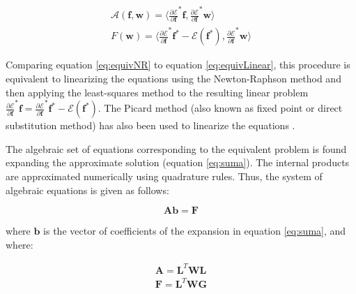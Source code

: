 \documentclass{CFD2011}
\begin{document}
\begin{eqnarray}
\mathcal{A}(\mathbf{f},\mathbf{w})= \big\langle \frac{\partial \mathcal{E}}{\partial \mathbf{f}}^*\mathbf{f} ,  \frac{\partial \mathcal{E}}{\partial \mathbf{f}}^*\mathbf{w} \big\rangle \nonumber \\
F(\mathbf{w})= \big\langle \frac{\partial \mathcal{E}}{\partial \mathbf{f}}^*\mathbf{f^*}-\mathcal{E}(\mathbf{f^*}) , \frac{\partial \mathcal{E}}{\partial \mathbf{f}}^*\mathbf{w} \big\rangle 
\label{eq:equivNR}
\end{eqnarray}


Comparing equation \ref{eq:equivNR} to equation \ref{eq:equivLinear}, this procedure is equivalent to linearizing the equations using the Newton-Raphson method and then applying the least-squares method to the resulting linear problem $ \frac{\partial \mathcal{E}}{\partial \mathbf{f}}^*\mathbf{f}=\frac{\partial \mathcal{E}}{\partial \mathbf{f}}^*\mathbf{f^*}-\mathcal{E}(\mathbf{f^*})$. The Picard method (also known as fixed point or direct substitution method) has also been used to linearize the equations \cite{Sporleder2010}.

The algebraic set of equations corresponding to the equivalent problem is found expanding the approximate solution (equation \ref{eq:suma}). The internal products are approximated numerically using quadrature rules. Thus, the system of algebraic equations is given as follows:

\begin{equation}
\mathbf{A} \mathbf{b} = \mathbf{F}
\end{equation}

\noindent where $\mathbf{b}$ is the vector of coefficients of the expansion in equation \ref{eq:suma}, and where:

\begin{eqnarray}
\mathbf{A}=\mathbf{L}^T\mathbf{W}\mathbf{L} \nonumber \\
\mathbf{F}=\mathbf{L}^T\mathbf{W}\mathbf{G} \nonumber
\end{eqnarray}
\end{document}
